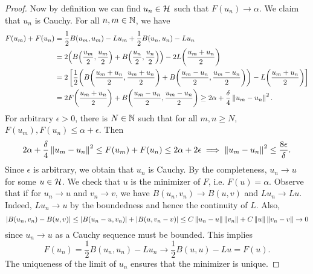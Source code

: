 \begin{proof}
    Now by definition we can find $u_n\in\mathcal{H}$ such that $F(u_n)\to\alpha$. 
    We claim that $u_n$ is Cauchy. For all $n,m\in\mathbb{N}$, we have 
    \begin{equation*}
        \begin{split}
            F(u_m) + F(u_n) &= \frac{1}{2}B(u_m,u_m) - Lu_m + \frac{1}{2}B(u_n,u_n) - Lu_n \\
            &= 2\pth{B\pth{\frac{u_m}{2},\frac{u_m}{2}} + B\pth{\frac{u_n}{2},\frac{u_n}{2}}} - 2L\pth{\frac{u_m+u_n}{2}} \\
            &= 2\sbrc{\frac{1}{2}\pth{B\pth{\frac{u_m+u_n}{2},\frac{u_m+u_n}{2}} + B\pth{\frac{u_m-u_n}{2},\frac{u_m-u_n}{2}}} - L\pth{\frac{u_m+u_n}{2}}} \\ 
            &= 2F\pth{\frac{u_m+u_n}{2}} + B\pth{\frac{u_m-u_n}{2},\frac{u_m-u_n}{2}} 
            \geq 2\alpha + \frac{\delta}{4}\norm{u_m-u_n}^2.
        \end{split}
    \end{equation*}
    For arbitrary $\epsilon>0$, there is $N\in\mathbb{N}$ such that for all $m,n\geq N$, 
    $F(u_m),F(u_n)\leq \alpha + \epsilon$. Then
    \begin{equation*}
        2\alpha + \frac{\delta}{4}\left\lVert {u_m-u_n} \right\rVert^2 \leq F(u_m) + F(u_n) \leq 2\alpha + 2\epsilon
        \implies \left\lVert {u_m-u_n} \right\rVert^2 \leq \frac{8\epsilon}{\delta}.
    \end{equation*}
    Since $\epsilon$ is arbitrary, we obtain that $u_n$ is Cauchy. By the 
    completeness, $u_n\to u$ for some $u\in\mathcal{H}$. We check that $u$ is the 
    minimizer of $F$, i.e. $F(u) = \alpha$. Observe that if for $u_n\to u$ 
    and $v_n\to v$, we have $B(u_n,v_n)\to B(u,v)$ and $Lu_n\to Lu$. Indeed, 
    $Lu_n\to u$ by the boundedness and hence the continuity of $L$. Also, 
    \begin{equation*}
        \left\lvert {B(u_n,v_n) - B(u,v)} \right\rvert \leq \left\lvert {B(u_n-u,v_n)} \right\rvert + \left\lvert {B(u,v_n-v)} \right\rvert 
        \leq C\left\lVert {u_n-u} \right\rVert\left\lVert {v_n} \right\rVert + C\left\lVert {u} \right\rVert\left\lVert {v_n-v} \right\rVert \to 0
    \end{equation*}
    since $u_n\to u$ as a Cauchy sequence must be bounded. This implies 
    \begin{equation*}
        F(u_n) = \frac{1}{2}B(u_n,u_n) - Lu_n \to \frac{1}{2}B(u,u) - Lu = F(u).
    \end{equation*}
    The uniqueness of the limit of $u_n$ ensures that the minimizer is unique.
\end{proof}
